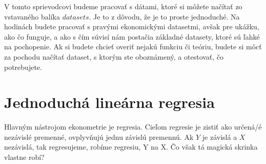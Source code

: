 V tomto sprievodcovi budeme pracovať s dátami, ktoré si môžete načítať
zo vstavaného balíka \(datasets\). Je to z dôvodu, že je to proste
jednoduché. Na hodinách budete pracovať s pravými ekonomickými
datasetmi, avšak pre ukážku, ako čo funguje, a ako s čím súvisí nám
postačia základné datasety, ktoré sú ľahké na pochopenie. Ak si budete
chcieť overiť nejakú funkciu či teóriu, budete si môcť za pochodu
načítať dataset, s ktorým ste oboznámený, a otestovať, čo potrebujete.

\begin{Shaded}
\begin{Highlighting}[]

\StringTok{ }\OperatorTok{::}


\NormalTok{(}\NormalTok{)}

\end{Highlighting}
\end{Shaded}

\newpage

\hypertarget{jednoduchuxe1-lineuxe1rna-regresia}{%
\section{Jednoduchá lineárna
regresia}\label{jednoduchuxe1-lineuxe1rna-regresia}}

Hlavným nástrojom ekonometrie je regresia. Cieľom regresie je zistiť ako
určená/é nezávislé premenné, ovplyvňujú jednu závislú premennú. Ak \(Y\)
je závislá a \(X\) nezávislá, tak regresujeme, robíme regresiu, Y na X.
Čo však tá magická skrinka vlastne robí?

\begin{Shaded}
\begin{Highlighting}[]

\end{Highlighting}
\end{Shaded}

